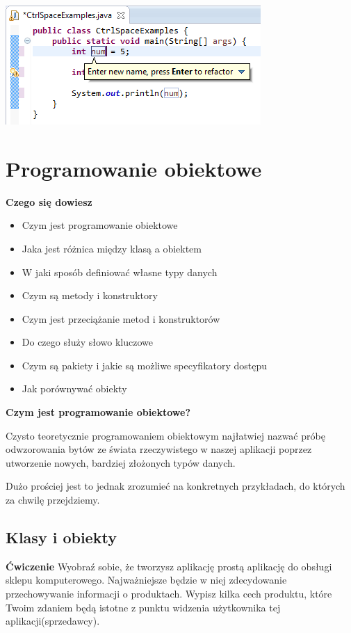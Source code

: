 \documentclass[letterpaper,10pt,english]{sphinxmanual}
\begin{document}
{\hfill\includegraphics{refactor.png}\hfill}


\section{Programowanie obiektowe}
\label{obiekty:programowanie-obiektowe}\label{obiekty:centrum-edukacji-obywatelskiej}\label{obiekty::doc}
\textbf{Czego się dowiesz}
\begin{itemize}
\item {} 
Czym jest programowanie obiektowe

\item {} 
Jaka jest różnica między klasą a obiektem

\item {} 
W jaki sposób definiować własne typy danych

\item {} 
Czym są metody i konstruktory

\item {} 
Czym jest przeciążanie metod i konstruktorów

\item {} 
Do czego służy słowo kluczowe

\item {} 
Czym są pakiety i jakie są możliwe specyfikatory dostępu

\item {} 
Jak porównywać obiekty

\end{itemize}

\textbf{Czym jest programowanie obiektowe?}

Czysto teoretycznie programowaniem obiektowym najłatwiej nazwać próbę odwzorowania bytów ze świata rzeczywistego w naszej aplikacji poprzez utworzenie nowych, bardziej złożonych typów danych.

Dużo prościej jest to jednak zrozumieć na konkretnych przykładach, do których za chwilę przejdziemy.


\subsection{Klasy i obiekty}
\label{obiekty:klasy-i-obiekty}
\textbf{Ćwiczenie}
Wyobraź sobie, że tworzysz aplikację prostą aplikację do obsługi sklepu komputerowego. Najważniejsze będzie w niej zdecydowanie przechowywanie informacji o produktach. Wypisz kilka cech produktu, które Twoim zdaniem będą istotne z punktu widzenia użytkownika tej aplikacji(sprzedawcy).
\end{document}
